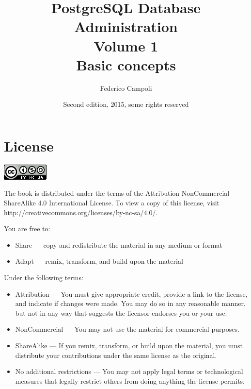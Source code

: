 \documentclass[oneside]{book}
\author{Federico Campoli}
\title{PostgreSQL Database Administration \\ Volume 1 \\ Basic concepts}
\date{Second edition, 2015, some rights reserved}
\begin{document}

\maketitle



\chapter*{License}
\begin{center}
 \includegraphics{images/cc_logo.png}
\end{center}

The book is distributed under the terms of the Attribution-NonCommercial-ShareAlike 4.0 International 
License. To view a copy of this license, visit http://creativecommons.org/licenses/by-nc-sa/4.0/.\newline


You are free to:
\begin{itemize}
 
\item     Share — copy and redistribute the material in any medium or format
\item     Adapt — remix, transform, and build upon the material

\end{itemize}


Under the following terms:
\begin{itemize}
\item    Attribution — You must give appropriate credit, provide a link to the license, and indicate if 
changes were made. You may do so in any reasonable manner, but not in any way that suggests the licensor 
endorses you or your use.

\item    NonCommercial — You may not use the material for commercial purposes.

\item    ShareAlike — If you remix, transform, or build upon the material, you must distribute your 
contributions under the same license as the original.

\item    No additional restrictions — You may not apply legal terms or technological measures that legally 
restrict others from doing anything the license permits.

\end{itemize}
\end{document}
